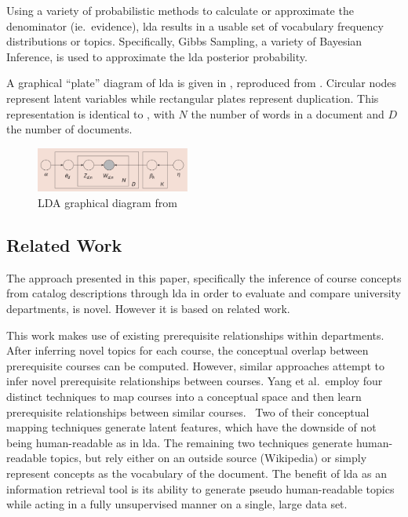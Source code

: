 
\noindent
Using a variety of probabilistic methods to calculate or approximate the denominator (ie.\ evidence), \ac{lda} results in a usable set of vocabulary frequency distributions or topics.
Specifically, Gibbs Sampling, a variety of Bayesian Inference, is used to approximate the \ac{lda} posterior probability.~\cite{Blei2003}


A graphical ``plate'' diagram of \ac{lda} is given in , reproduced from \cite{Blei2003}.
Circular nodes represent latent variables while rectangular plates represent duplication.
This representation is identical to , with $N$ the number of words in a document and $D$ the number of documents.


\begin{figure}
  \includegraphics[width=0.45\textwidth]{figures/lda-plates}
  \caption{LDA graphical diagram from \cite{Blei2012}\label{fig:lda-plates}}
\end{figure}


\subsection{Related Work}
\label{sec:related-work}


The approach presented in this paper, specifically the inference of course concepts from catalog descriptions through \ac{lda} in order to evaluate and compare university departments, is novel.
However it is based on related work.


This work makes use of existing prerequisite relationships within departments.
After inferring novel topics for each course, the conceptual overlap between prerequisite courses can be computed.
However, similar approaches attempt to infer novel prerequisite relationships between courses.
Yang et al.\ employ four distinct techniques to map courses into a conceptual space and then learn prerequisite relationships between similar courses.~\cite{Yang2015}
Two of their conceptual mapping techniques generate latent features, which have the downside of not being human-readable as in \ac{lda}.
The remaining two techniques generate human-readable topics, but rely either on an outside source (Wikipedia) or simply represent concepts as the vocabulary of the document.
The benefit of \ac{lda} as an information retrieval tool is its ability to generate pseudo human-readable topics while acting in a fully unsupervised manner on a single, large data set.

